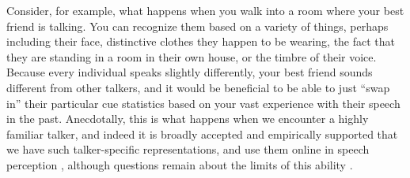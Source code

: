 Consider, for example, what happens when you walk into a room where your best friend is talking.  You can recognize them based on a variety of things, perhaps including their face, distinctive clothes they happen to be wearing, the fact that they are standing in a room in their own house, or the timbre of their voice.  Because every individual speaks slightly differently, your best friend sounds different from other talkers, and it would be beneficial to be able to just ``swap in'' their particular cue statistics based on your vast experience with their speech in the past.  Anecdotally, this is what happens when we encounter a highly familiar talker, and indeed it is broadly accepted and empirically supported that we have such talker-specific representations, and use them online in speech perception \autocite{Creel2008,Creel2011,Goldinger1996,Nygaard1998,Palmeri1993,Remez1997}, although questions remain about the limits of this ability \autocite{Magnuson2007a,Pardo2006}.

